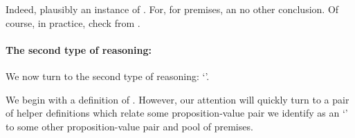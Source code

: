 \begin{note}
  Indeed, plausibly an instance of \csVImp{}.
  For, \csVed{} for premises, an no other conclusion.
  Of course, in practice, check from \requ{}.

\end{note}


\paragraph*{The second type of reasoning: \adB{}}

\begin{note}
  We now turn to the second type of reasoning: `\adB{}'.

  We begin with a definition of \adB{}.
  However, our attention will quickly turn to a pair of helper definitions which relate some proposition-value pair we identify as an `\itp{}' to some other proposition-value pair and pool of premises.
\end{note}

